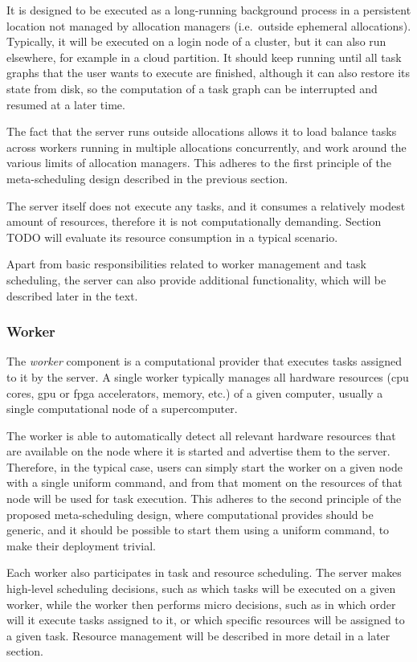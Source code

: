 It is designed to be executed as a long-running background process in a persistent location not
managed by allocation managers (i.e.\ outside ephemeral allocations). Typically, it will be
executed on a login node of a cluster, but it can also run elsewhere, for example in a cloud
partition. It should keep running until all task graphs that the user wants to execute are
finished, although it can also restore its state from disk, so the computation of a task graph can
be interrupted and resumed at a later time.

The fact that the server runs outside allocations allows it to load balance tasks across workers
running in multiple allocations concurrently, and work around the various limits of allocation
managers. This adheres to the first principle of the meta-scheduling design described in the
previous section.

The \hyperqueue{} server itself does not execute any tasks, and it consumes a relatively
modest amount of resources, therefore it is not computationally demanding. Section
TODO will evaluate its resource consumption in a typical scenario.

Apart from basic responsibilities related to worker management and task scheduling, the server can
also provide additional functionality, which will be described later in the text.

\subsubsection*{Worker}
The \emph{worker} component is a computational provider that executes tasks assigned to it
by the server. A single worker typically manages all hardware resources (\gls{cpu}
cores, \gls{gpu} or \gls{fpga} accelerators, memory, etc.) of a given
computer, usually a single computational node of a supercomputer.

The worker is able to automatically detect all relevant hardware resources that are available on
the node where it is started and advertise them to the server. Therefore, in the typical case,
users can simply start the worker on a given node with a single uniform command, and from that
moment on the resources of that node will be used for task execution. This adheres to the second
principle of the proposed meta-scheduling design, where computational provides should be generic,
and it should be possible to start them using a uniform command, to make their deployment trivial.

Each worker also participates in task and resource scheduling. The server makes high-level
scheduling decisions, such as which tasks will be executed on a given worker, while the worker then
performs micro decisions, such as in which order will it execute tasks assigned to it, or which
specific resources will be assigned to a given task. Resource management will be described in more
detail in a later section.

